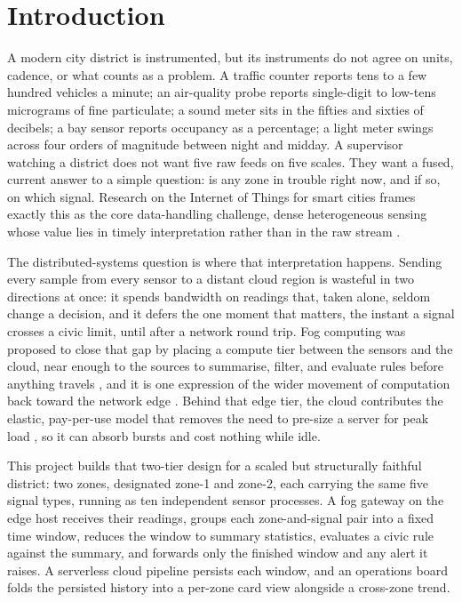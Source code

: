 \documentclass[conference]{IEEEtran}
\begin{document}
\section{Introduction}

A modern city district is instrumented, but its instruments do not agree on units, cadence, or what counts as a problem. A traffic counter reports tens to a few hundred vehicles a minute; an air-quality probe reports single-digit to low-tens micrograms of fine particulate; a sound meter sits in the fifties and sixties of decibels; a bay sensor reports occupancy as a percentage; a light meter swings across four orders of magnitude between night and midday. A supervisor watching a district does not want five raw feeds on five scales. They want a fused, current answer to a simple question: is any zone in trouble right now, and if so, on which signal. Research on the Internet of Things for smart cities frames exactly this as the core data-handling challenge, dense heterogeneous sensing whose value lies in timely interpretation rather than in the raw stream \cite{zanella2014, perera2014}.

The distributed-systems question is where that interpretation happens. Sending every sample from every sensor to a distant cloud region is wasteful in two directions at once: it spends bandwidth on readings that, taken alone, seldom change a decision, and it defers the one moment that matters, the instant a signal crosses a civic limit, until after a network round trip. Fog computing was proposed to close that gap by placing a compute tier between the sensors and the cloud, near enough to the sources to summarise, filter, and evaluate rules before anything travels \cite{bonomi2012, yousefpour2019}, and it is one expression of the wider movement of computation back toward the network edge \cite{shi2016, satyanarayanan2017}. Behind that edge tier, the cloud contributes the elastic, pay-per-use model that removes the need to pre-size a server for peak load \cite{armbrust2010}, so it can absorb bursts and cost nothing while idle.

This project builds that two-tier design for a scaled but structurally faithful district: two zones, designated zone-1 and zone-2, each carrying the same five signal types, running as ten independent sensor processes. A fog gateway on the edge host receives their readings, groups each zone-and-signal pair into a fixed time window, reduces the window to summary statistics, evaluates a civic rule against the summary, and forwards only the finished window and any alert it raises. A serverless cloud pipeline persists each window, and an operations board folds the persisted history into a per-zone card view alongside a cross-zone trend.
\end{document}
